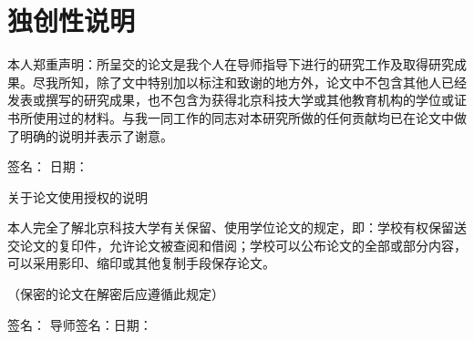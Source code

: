 
\chapter*{\centering 独创性说明}
\doublespacing
本人郑重声明：所呈交的论文是我个人在导师指导下进行的研究工作及取得研究成果。尽我所知，除了文中特别加以标注和致谢的地方外，论文中不包含其他人已经发表或撰写的研究成果，也不包含为获得北京科技大学或其他教育机构的学位或证书所使用过的材料。与我一同工作的同志对本研究所做的任何贡献均已在论文中做了明确的说明并表示了谢意。\par

\vspace{3ex}

\begin{flushright}
签名：\underline{\makebox[3cm]{\qquad}} 日期：\underline{\makebox[3cm]{\qquad}}
\end{flushright}

\vspace{10ex}

\begin{center}
{ 关于论文使用授权的说明} 
\end{center}
\par

\vspace{5ex}


本人完全了解北京科技大学有关保留、使用学位论文的规定，即：学校有权保留送交论文的复印件，允许论文被查阅和借阅；学校可以公布论文的全部或部分内容，可以采用影印、缩印或其他复制手段保存论文。\par
（保密的论文在解密后应遵循此规定）\par

\vspace{3ex}

\begin{flushright}
签名：\underline{\makebox[3cm]{\qquad}} 导师签名：\underline{\makebox[3cm]{\qquad}}日期：\underline{\makebox[3cm]{\qquad}}
\end{flushright}

